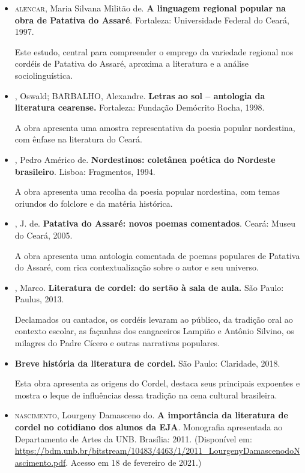 \documentclass[12pt]{extarticle}
\begin{document}
\begin{itemize}

\item \textsc{alencar}, Maria Silvana Militão de. \textbf{A linguagem regional
popular na obra de Patativa do Assaré}. Fortaleza: Universidade
Federal do Ceará, 1997.

Este estudo, central para compreender o emprego da variedade regional
nos cordéis de Patativa do Assaré, aproxima a literatura e a análise
sociolinguística.


\item {}, Oswald; BARBALHO, Alexandre. \textbf{Letras ao sol --
antologia da literatura cearense.} Fortaleza: Fundação Demócrito
Rocha, 1998.

A obra apresenta uma amostra representativa da poesia popular
nordestina, com ênfase na literatura do Ceará.


\item {}, Pedro Américo de. \textbf{Nordestinos: coletânea poética do
Nordeste brasileiro}. Lisboa: Fragmentos, 1994.

A obra apresenta uma recolha da poesia popular nordestina, com temas
oriundos do folclore e da matéria histórica.


\item {}, J. de. \textbf{Patativa do Assaré: novos poemas
comentados}. Ceará: Museu do Ceará, 2005.

A obra apresenta uma antologia comentada de poemas populares de Patativa
do Assaré, com rica contextualização sobre o autor e seu universo.


\item {}, Marco. \textbf{Literatura de cordel: do sertão à sala de
aula.} São Paulo: Paulus, 2013.

Declamados ou cantados, os cordéis levaram ao público, da tradição oral
ao contexto escolar, as façanhas dos cangaceiros Lampião e Antônio
Silvino, os milagres do Padre Cícero e outras narrativas populares.


\item {} \textbf{Breve história da literatura de cordel.} São
Paulo: Claridade, 2018.

Esta obra apresenta as origens do Cordel, destaca seus principais
expoentes e mostra o leque de influências dessa tradição na cena
cultural brasileira.


\item \textsc{nascimento}, Lourgeny Damasceno do. \textbf{A importância da literatura
de cordel no cotidiano dos alunos da EJA}. Monografia apresentada ao
Departamento de Artes da UNB. Brasília: 2011. (Disponível em:
\url{https://bdm.unb.br/bitstream/10483/4463/1/2011_LourgenyDamascenodoNascimento.pdf}.
Acesso em 18 de fevereiro de 2021.)


\end{itemize}
\end{document}
